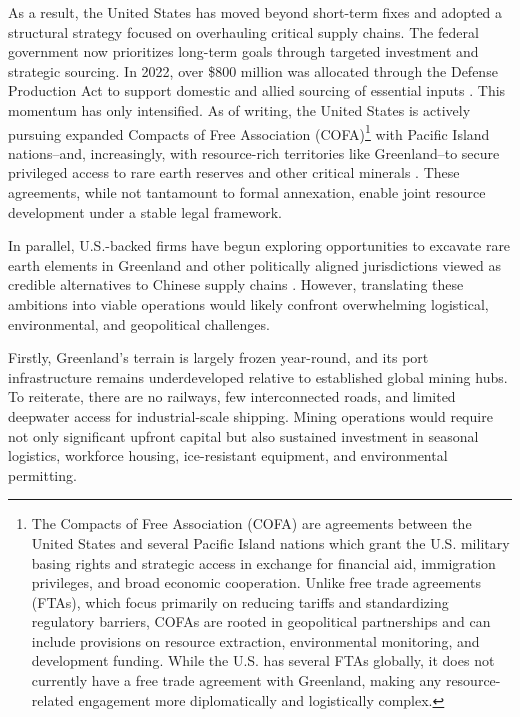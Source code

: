 \documentclass{adonis}
\begin{document}
   As a result, the United States has moved beyond short-term fixes and adopted a structural strategy focused on overhauling critical supply chains. The federal government now prioritizes long-term goals through targeted investment and strategic sourcing. In 2022, over \$800 million was allocated through the Defense Production Act to support domestic and allied sourcing of essential inputs \citep{garamone2022ndaa}. This momentum has only intensified. As of writing, the United States is actively pursuing expanded Compacts of Free Association (COFA)\footnote{The Compacts of Free Association (COFA) are agreements between the United States and several Pacific Island nations which grant the U.S. military basing rights and strategic access in exchange for financial aid, immigration privileges, and broad economic cooperation. Unlike free trade agreements (FTAs), which focus primarily on reducing tariffs and standardizing regulatory barriers, COFAs are rooted in geopolitical partnerships and can include provisions on resource extraction, environmental monitoring, and development funding. While the U.S. has several FTAs globally, it does not currently have a free trade agreement with Greenland, making any resource-related engagement more diplomatically and logistically complex.} with Pacific Island nations–and, increasingly, with resource-rich territories like Greenland–to secure privileged access to rare earth reserves and other critical minerals \citep{slattery2025association}. These agreements, while not tantamount to formal annexation, enable joint resource development under a stable legal framework.

    In parallel, U.S.-backed firms have begun exploring opportunities to excavate rare earth elements in Greenland and other politically aligned jurisdictions viewed as credible alternatives to Chinese supply chains \citep{volcovici2025greenland}. However, translating these ambitions into viable operations would likely confront overwhelming logistical, environmental, and geopolitical challenges. 
    
    Firstly, Greenland’s terrain is largely frozen year-round, and its port infrastructure remains underdeveloped relative to established global mining hubs. To reiterate, there are no railways, few interconnected roads, and limited deepwater access for industrial-scale shipping. Mining operations would require not only significant upfront capital but also sustained investment in seasonal logistics, workforce housing, ice-resistant equipment, and environmental permitting. 
    
\end{document}
